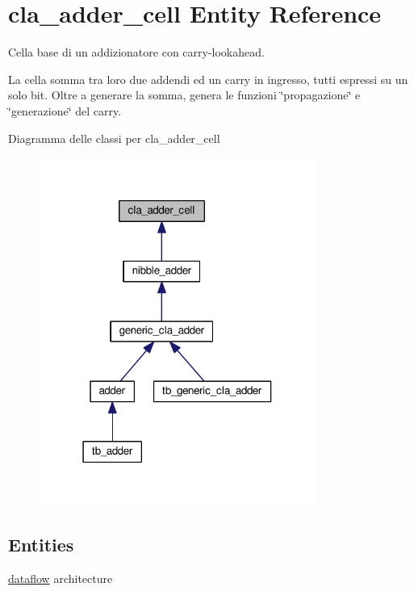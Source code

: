 \hypertarget{classcla__adder__cell}{\section{cla\+\_\+adder\+\_\+cell Entity Reference}
\label{classcla__adder__cell}
}


Cella base di un addizionatore con carry-\/lookahead.

La cella somma tra loro due addendi ed un carry in ingresso, tutti espressi su un solo bit. Oltre a generare la somma, genera le funzioni \char`\"{}propagazione\char`\"{} e \char`\"{}generazione\char`\"{} del carry.  




Diagramma delle classi per cla\+\_\+adder\+\_\+cell
\nopagebreak
\begin{figure}[H]
\begin{center}
\leavevmode
\includegraphics[width=255pt]{classcla__adder__cell__inherit__graph}
\end{center}
\end{figure}
\subsection*{Entities}
\begin{DoxyCompactItemize}
\item 
\hyperlink{classcla__adder__cell_1_1dataflow}{dataflow} architecture
\end{DoxyCompactItemize}
